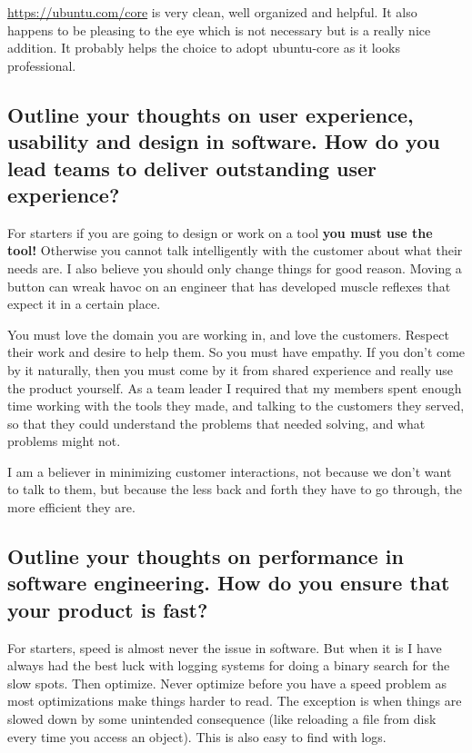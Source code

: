 \documentclass[letter,12pt]{article}
\begin{document}
\href{https://ubuntu.com/core}{https://ubuntu.com/core} is very clean, well organized and helpful. It also happens to be pleasing to the eye which is not necessary but is a really nice addition. It probably helps the choice to adopt ubuntu-core as it looks professional.

\subsection{Outline your thoughts on user experience, usability and design in software. How do you lead teams to deliver outstanding user experience?}
For starters if you are going to design or work on a tool \textbf{you must use the tool!} Otherwise you cannot talk intelligently with the customer about what their needs are. I also believe you should only change things for good reason. Moving a button can wreak havoc on an engineer that has developed muscle reflexes that expect it in a certain place.

You must love the domain you are working in, and love the customers. Respect their work and desire to help them. So you must have empathy. If you don't come by it naturally, then you must come by it from shared experience and really use the product yourself. As a team leader I required that my members spent enough time working with the tools they made, and talking to the customers they served, so that they could understand the problems that needed solving, and what problems might not. 

I am a believer in minimizing customer interactions, not because we don't want to talk to them, but because the less back and forth they have to go through, the more efficient they are. 

\subsection{Outline your thoughts on performance in software engineering. How do you ensure that your product is fast?}
For starters, speed is almost never the issue in software. But when it is I have always had the best luck with logging systems for doing a binary search for the slow spots. Then optimize. Never optimize before you have a speed problem as most optimizations make things harder to read. The exception is when things are slowed down by some unintended consequence (like reloading a file from disk every time you access an object). This is also easy to find with logs.
\end{document}
